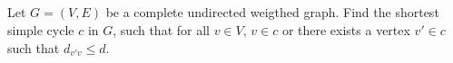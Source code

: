 \subsection{}

Let $G = (V,E)$ be a complete undirected weigthed graph. Find the
shortest simple cycle $c$ in $G$, such that for all $v \in V$, $v \in
c$ or there exists a vertex $v' \in c$ such that $d_{v'v} \leq d$.
